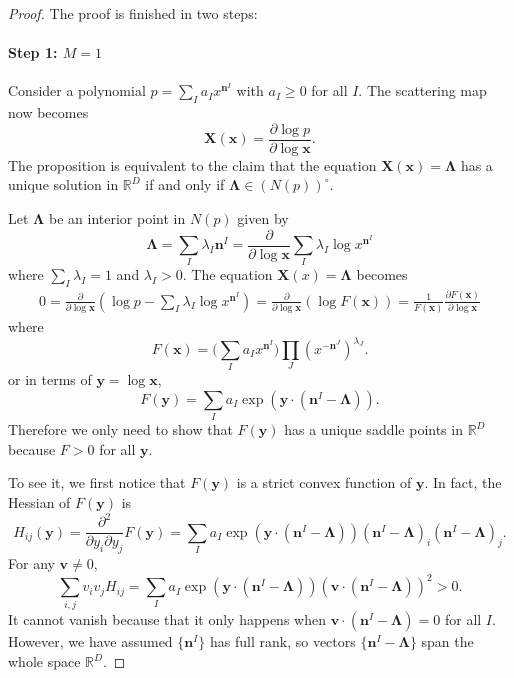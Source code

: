 \documentclass[12pt]{article}
\theoremstyle{definition}
\theoremstyle{plain}
\begin{document}
	\begin{proof}
	The proof is finished in two steps:
	\paragraph{Step 1: $M=1$}
	Consider a polynomial $p=\sum_{I} a_I x^{\mathbf n^I}$ with $a_I\geq 0$ for all $I$. 
	The scattering map now becomes
	\[
		\mathbf X(\mathbf{x})=\frac{\partial \log p}{\partial \log \mathbf x}.
	\]
	The proposition is equivalent to the claim that the equation $\mathbf X(\mathbf{x})=\mathbf\Lambda$ has a unique solution in $\mathbb R^D$ 
	if and only if $\mathbf\Lambda\in (N(p))^\circ$. 
	
	Let $\mathbf{\Lambda}$ be an interior point in $N(p)$ given by 
	\[
		\mathbf \Lambda=\sum_{I}\lambda_I\mathbf n^I
		=\frac{\partial}{\partial \log \mathbf x}\sum_{I}\lambda_I \log x^{\mathbf n^I}
	\]
	where $\sum_I \lambda_I=1$ and $\lambda_I > 0$. The equation $\mathbf X(x)=\mathbf \Lambda$ becomes
	\[
	\begin{aligned}
		0=\frac{\partial }{\partial \log \mathbf x}\left(
			\log p-\sum_{I}\lambda_I \log x^{\mathbf n^I}
		\right)=\frac{\partial }{\partial \log \mathbf x}\left(
		\log F(\mathbf x)
		\right)=\frac{1}{F(\mathbf x)}\frac{\partial F(\mathbf x)}{\partial \log \mathbf x}
	\end{aligned}
	\]
	where
	\[
		F(\mathbf x)=\biggl(\sum_I a_I x^{\mathbf{n}^I}\biggr)\prod_J (x^{-\mathbf n^J})^{\lambda_J}.
	\]
	or in terms of $\mathbf y=\log \mathbf x$, 
	\[
		F(\mathbf y)
		=\sum_I a_I \exp\left(\mathbf{y}\cdot \left(\mathbf{n}^I-\mathbf{\Lambda}\right)\right).
	\]
	Therefore we only need to show that $F(\mathbf y)$ has a unique saddle points in $\mathbb R^D$ 
	because $F>0$ for all $\mathbf y$.
	
	To see it, we first notice that $F(\mathbf y)$ is a strict convex function of $\mathbf y$. In fact, the Hessian of $F(\mathbf y)$ is 
	\[
		H_{ij}(\mathbf y)=\frac{\partial^2}{\partial y_i\partial y_j}F(\mathbf y)=\sum_I a_I \exp\left(\mathbf{y}\cdot \left(\mathbf{n}^I-\mathbf{\Lambda}\right)\right)\left(\mathbf{n}^I-\mathbf{\Lambda}\right)_i\left(\mathbf{n}^I-\mathbf{\Lambda}\right)_j.
	\]
	For any $\mathbf v\neq 0$, 
	\[
		\sum_{i,j}v_iv_jH_{ij}=\sum_I a_I \exp\left(\mathbf{y}\cdot \left(\mathbf{n}^I-\mathbf{\Lambda}\right)\right) \left(\mathbf v\cdot (\mathbf{n}^I-\mathbf{\Lambda})\right)^2 >0.
	\]
	It cannot vanish because that it only happens when $\mathbf v\cdot (\mathbf{n}^I-\mathbf{\Lambda})=0$ 
	for all $I$. However, we have assumed $\{\mathbf n^I\}$ has full rank, so
	vectors $\{\mathbf{n}^I-\mathbf{\Lambda}\}$ span the whole space 
	$\mathbb R^D$. 
	

\end{proof}
\end{document}
